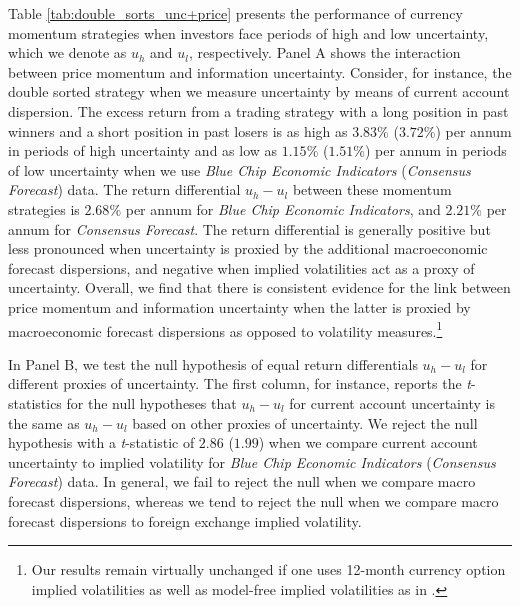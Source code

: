 Table \ref{tab:double_sorts_unc+price} presents the performance of currency momentum strategies when investors face periods of high and low  uncertainty, which we denote as $u_h$ and $u_l$, respectively. Panel A shows the interaction between price momentum and information uncertainty. Consider, for instance, the double sorted strategy when we measure uncertainty by means of current account dispersion. The excess return from a trading strategy with a long position in past winners and a short position in past losers is as high as $3.83\%$ ($3.72\%$) per annum in periods of high uncertainty and as low as $1.15\%$ ($1.51\%$) per annum in periods of low uncertainty when we use \emph{Blue Chip Economic Indicators} (\emph{Consensus Forecast}) data. The return differential $u_h-u_l$ between these momentum strategies is $2.68\%$ per annum for \emph{Blue Chip Economic Indicators}, and $2.21\%$ per annum for \emph{Consensus Forecast}. The return differential is generally positive but less pronounced when uncertainty is proxied by the additional macroeconomic forecast dispersions, and negative when implied volatilities act as a proxy of uncertainty.  Overall, we find that there is consistent evidence for the link between price momentum and information uncertainty when the latter is proxied by macroeconomic forecast dispersions as opposed to volatility measures.\footnote{Our results remain virtually unchanged if one uses 12-month currency option implied volatilities as well as model-free implied volatilities as in \citet{dellacorte_etal2014}.}

In Panel B, we test the null hypothesis of equal return differentials $u_h-u_l$ for different proxies of uncertainty. The first column, for instance, reports the \emph{t}-statistics for the null hypotheses that $u_h-u_l$ for current account uncertainty is the same as $u_h-u_l$ based on other proxies of uncertainty. We reject the null hypothesis with a \emph{t}-statistic of $2.86$ ($1.99$) when we compare current account uncertainty to implied volatility for \emph{Blue Chip Economic Indicators} (\emph{Consensus Forecast}) data. In general, we fail to reject the null when we compare macro forecast dispersions, whereas we tend to reject the null when we compare macro forecast dispersions to foreign exchange implied volatility.


